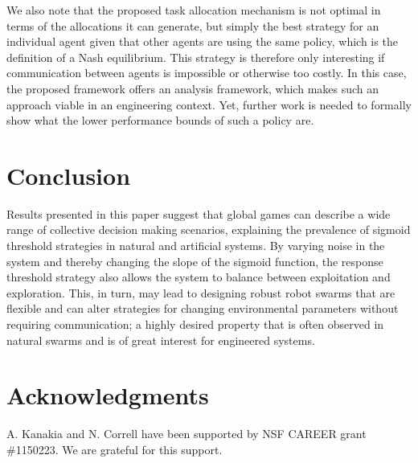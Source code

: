 \documentclass[smallextended]{svjour3}       %
\begin{document}
We also note that the proposed task allocation mechanism is not optimal in terms of the allocations it can generate, but simply the best strategy for an individual agent given that other agents are using the same policy, which is the definition of a Nash equilibrium. This strategy is therefore only interesting if communication between agents is impossible or otherwise too costly. In this case, the proposed framework offers an analysis framework, which makes such an approach viable in an engineering context. Yet, further work is needed to formally show what the lower performance bounds of such a policy are. 



\section{Conclusion}
Results presented in this paper suggest that global games can  describe a wide range of collective decision making scenarios, explaining the prevalence of sigmoid threshold strategies in natural and artificial systems. By varying noise in the system and thereby changing the slope of the sigmoid function, the response threshold strategy also allows the system to balance between exploitation and exploration. This, in turn, may lead to designing robust robot swarms that are flexible and can alter strategies for changing environmental parameters without requiring communication; a highly desired property that is often observed in natural swarms and is of great interest for engineered systems.

\section*{Acknowledgments}
A. Kanakia and N. Correll have been supported by NSF CAREER grant \#1150223. We are grateful for this support.






\end{document}

